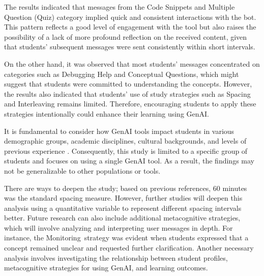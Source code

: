 \documentclass[a4paper,twoside]{article}
\begin{document}
The results indicated that messages from the Code Snippets and Multiple Question
(Quiz) category implied quick and consistent interactions with the bot. This
pattern reflects a good level of engagement with the tool but also raises the
possibility of a lack of more profound reflection on the received content, given
that students' subsequent messages were sent consistently within short intervals.

On the other hand, it was observed that most students' messages concentrated on
categories such as Debugging Help and Conceptual Questions, which might suggest
that students were committed to understanding the concepts. However, the results
also indicated that students' use of study strategies such as Spacing and
Interleaving remains limited. Therefore, encouraging students to apply these
strategies intentionally could enhance their learning using GenAI.

It is fundamental to consider how GenAI tools impact students in various
demographic groups, academic disciplines, cultural backgrounds, and levels of
previous experience \citep{catalan21} \citep{neo22}. Consequently, this study is
limited to a specific group of students and focuses on using a single GenAI
tool. As a result, the findings may not be generalizable to other populations or
tools.

There are ways to deepen the study; based on previous references, 60 minutes was
the standard spacing measure. However, further studies will deepen this analysis
using a quantitative variable to represent different spacing intervals better.
Future research can also include additional metacognitive strategies, which will
involve analyzing and interpreting user messages in depth. For instance, the
Monitoring strategy was evident when students expressed that a concept remained
unclear and requested further clarification. Another necessary analysis involves
investigating the relationship between student profiles, metacognitive
strategies for using GenAI, and learning outcomes.


{\small
}
\end{document}
